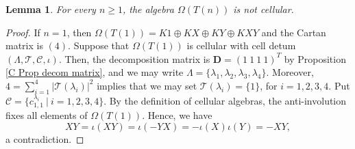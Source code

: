 \documentclass[12pt]{amsart}
\newtheorem{lem}[thm]{Lemma}
\numberwithin{equation}{thm}
\newcommand\bD{\mathbf D}
\newcommand\cC{\mathcal{C}}
\newcommand\cT{\mathcal{T}}
\newcounter{ni}
\begin{document}
{\begin{lem}\label{D nondom}
For every $n\geq 1$, the algebra $\Omega(T(n))$ is not cellular.
\end{lem}
\begin{proof} If $n=1$, then $\Omega(T(1)) = K1\oplus KX\oplus KY \oplus KXY$ and 
the Cartan matrix is $(4)$. Suppose that $\Omega(T(1))$ is cellular with cell detum $(\Lambda, \cT,\cC,\iota)$.  
Then, the decomposition matrix is $\bD=(1\ 1\ 1\ 1)^T$ by Proposition \ref{C Prop decom matrix},  
and we may write $\Lambda=\{\lambda_1, \lambda_2, \lambda_3, \lambda_4\}$. 
Moreover, $4=\sum_{i=1}^4 |\cT(\lambda_i)|^2$ implies that we may set $\cT(\lambda_i)=\{1\}$, for $i=1,2,3,4$.
Put $\cC=\{c^{\lambda_i}_{1,1}\ |\ i=1,2,3,4\}$. By the definition of cellular algebras, the anti-involution fixes all elements of $\Omega(T(1))$. Hence, we have
\[ XY=\iota(XY)=\iota(-YX)=-\iota(X)\iota(Y)=-XY, \]
a contradiction. 


\end{proof}}
\end{document}
